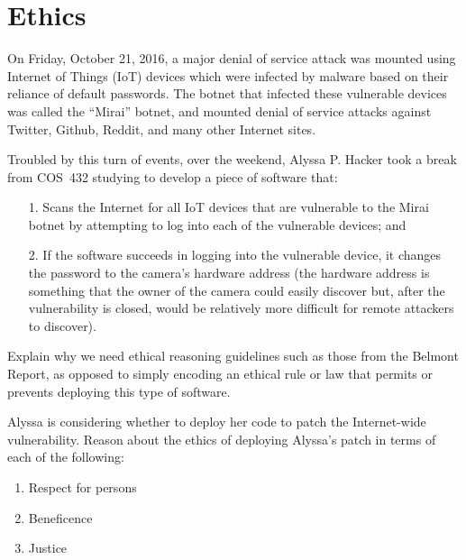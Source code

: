\section{Ethics}

On Friday, October 21, 2016, a major denial of service attack was
mounted using Internet of Things (IoT) devices which were infected by
malware based on their reliance of default passwords. The botnet that
infected these vulnerable devices was called the ``Mirai'' botnet, and
mounted denial of service attacks against Twitter, Github, Reddit, and
many other Internet sites.

Troubled by this turn of events, over the weekend, Alyssa P. Hacker took a break from
COS~432 studying to develop a 
piece of software that:
\begin{enumerate}
\item[1.] Scans the Internet for all IoT devices that are vulnerable to the
  Mirai botnet by attempting to log into each of the vulnerable devices; and
\item[2.] If the software succeeds in logging into the vulnerable device, it
  changes the password to the camera's hardware address (the hardware
  address is something that the owner of the camera could easily
  discover but, after the vulnerability is closed, would be relatively
  more difficult for remote attackers to discover).
\end{enumerate}

 Explain why we need ethical reasoning guidelines such as those
from the Belmont Report, as opposed to simply encoding an ethical rule
or law that permits or prevents deploying this type of software.
\eprob

\newpage
{} Alyssa is considering whether to deploy her code to patch the
Internet-wide vulnerability.  Reason about the ethics of deploying Alyssa's
patch in terms of each of the following:
\begin{enumerate}
\item Respect for persons
\item Beneficence
\item Justice
\end{enumerate}
\eprob

